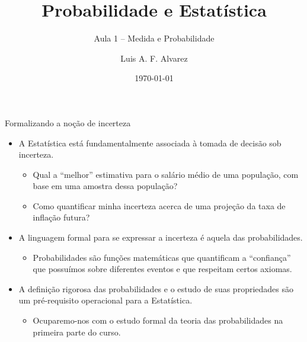 \documentclass[11pt]{beamer}
\author{Luis A. F. Alvarez}
\title{Probabilidade e Estatística}
\subtitle{Aula 1 -- Medida e Probabilidade}
\date{\today}
\begin{document}
	
	\maketitle

\begin{frame}{Formalizando a noção de incerteza}
	\begin{itemize}
		\item A Estatística está fundamentalmente associada à tomada de decisão sob incerteza.
		\begin{itemize}
			\item Qual a ``melhor'' estimativa para o salário médio de uma população, com base em uma amostra dessa população?
			\item Como quantificar minha incerteza acerca de uma projeção da taxa de inflação futura?
		\end{itemize}
		\item A linguagem formal para se expressar a incerteza é aquela das probabilidades.
		\begin{itemize}
			\item Probabilidades são funções matemáticas que quantificam a ``confiança'' que possuímos sobre diferentes {\color{blue}eventos} e que respeitam certos axiomas.
		\end{itemize}
		\item A definição rigorosa das probabilidades e o estudo de suas propriedades são um pré-requisito operacional para a Estatística.
		\begin{itemize}
			\item Ocuparemo-nos com o estudo formal da teoria das probabilidades na primeira parte do curso.
		\end{itemize}
		
	\end{itemize}
\end{frame}
\end{document}
